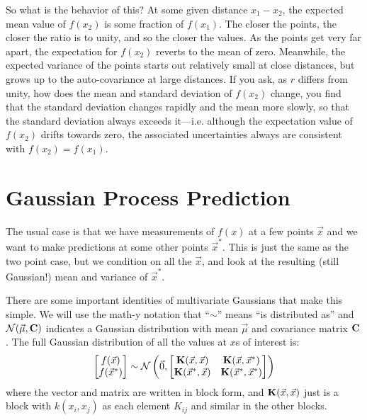 So what is the behavior of this? At some given distance $x_1-x_2$, the
expected mean value of $f(x_2)$ is some fraction of $f(x_1)$. The
closer the points, the closer the ratio is to unity, and so the closer
the values. As the points get very far apart, the expectation for
$f(x_2)$ reverts to the mean of zero. Meanwhile, the expected variance
of the points starts out relatively small at close distances, but
grows up to the auto-covariance at large distances. If you ask, as $r$
differs from unity, how does the mean and standard deviation of
$f(x_2)$ change, you find that the standard deviation changes rapidly
and the mean more slowly, so that the standard deviation always
exceeds it---i.e. although the expectation value of $f(x_2)$ drifts
towards zero, the associated uncertainties always are consistent with
$f(x_2)=f(x_1)$.

\section{Gaussian Process Prediction}

The usual case is that we have measurements of $f(x)$ at a few points
$\vec{x}$ and we want to make predictions at some other points
$\vec{x}^\ast$. This is just the same as the two point case, but we 
condition on all the $\vec{x}$, and look at the resulting (still
Gaussian!) mean and variance of $\vec{x}^{\ast}$.

There are some important identities of multivariate Gaussians that
make this simple. We will use the math-y notation that ``$\sim$''
means ``is distributed as'' and $\mathcal{N}(\vec{\mu}, {\bf C})$
indicates a Gaussian distribution with mean $\vec{\mu}$ and covariance
matrix ${\bf C}$. The full Gaussian distribution of all the values at
$x$s of interest is:
\begin{equation}
\left[\begin{matrix}
 f(\vec{x}) \cr
 f(\vec{x}^\ast)
 \end{matrix}\right]
 \sim \mathcal{N}\left( \vec{0},
\left[\begin{matrix}
 {\bf K}(\vec{x}, \vec{x}) & {\bf K}(\vec{x}, \vec{x}^\ast) \cr
 {\bf K}(\vec{x}^\ast, \vec{x}) & {\bf K}(\vec{x}^\ast, \vec{x}^\ast)
 \end{matrix}\right] \right)
\end{equation}
where the vector and matrix are written in block form, and
${\bf K}(\vec{x}, \vec{x})$ just is a block with $k(x_i, x_j)$ as each
element $K_{ij}$ and similar in the other blocks.

